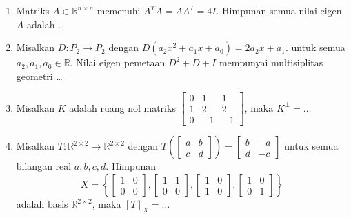 \documentclass[12pt,twoside]{article}
\begin{document}
\begin{enumerate}
	\item Matriks $A \in \mathbb{R}^{n \times n}$ memenuhi $A^TA = AA^T = 4I$. Himpunan semua nilai eigen $A$ adalah \dots

	\item Misalkan $D : P_2 \to P_2$ dengan $D(a_2x^2+a_1x+a_0)=2a_2x+a_1$. untuk semua $a_2,a_1,a_0 \in \mathbb{R}.$ Nilai eigen pemetaan $D^2+D+I$ mempunyai multisiplitas geometri \dots

	\item Misalkan $K$ adalah ruang nol matriks $\left[ \begin{array}{ccc}
				      0 & 1 & 1 \\1&2&2\\0&-1&-1
			      \end{array} \right]$, maka $K^\perp =\dots$

	\item Misalkan $T : \mathbb{R}^{2 \times 2} \to \mathbb{R}^{2 \times 2}$ dengan $T\left( \left[ \begin{array}{cc}
				      a & b \\c&d
			      \end{array} \right] \right) = \left[ \begin{array}{cc}
				      b & -a \\d&-c
			      \end{array} \right]$ untuk semua bilangan real $a,b,c,d.$ Himpunan $$X = \left\lbrace \left[ \begin{array}{cc}
				      1 & 0 \\0&0
			      \end{array} \right], \left[ \begin{array}{cc}
				      1 & 1 \\0&0
			      \end{array} \right], \left[ \begin{array}{cc}
				      1 & 0 \\1&0
			      \end{array} \right], \left[ \begin{array}{cc}
				      1 & 0 \\0&1
			      \end{array} \right] \right\rbrace$$ adalah basis $\mathbb{R}^{2 \times 2}$, maka $[T]_X =\dots$
\end{enumerate}
\end{document}
